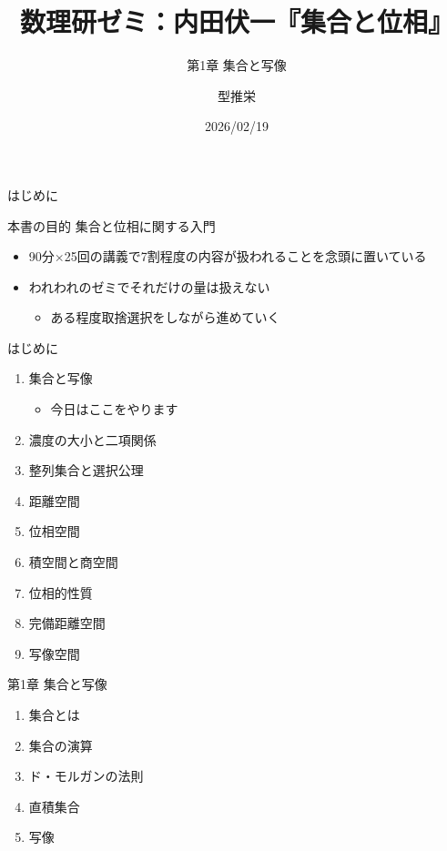 \documentclass[uplatex,a4paper,dvipdfmx,aspectratio=169,11pt]{beamer}
\title[内田集合位相ゼミ2]{数理研ゼミ：内田伏一『集合と位相』}
\subtitle{第1章 集合と写像}
\author{型推栄}
\institute[M1]{大学院情報理工学研究科 I専攻 岡本吉央研究室 M1}
\date{2026/02/19}
\begin{document}
\begin{frame}
    \titlepage
\end{frame}


\begin{frame}[fragile]{はじめに}
    \begin{block}{本書の目的}
        \Large \alert{集合}と\alert{位相}に関する入門
    \end{block}

    \bigskip

    \begin{itemize}
        \item 90分$\times$25回の講義で7割程度の内容が扱われることを念頭に置いている
        \item われわれのゼミでそれだけの量は扱えない
            \begin{itemize}
                \item ある程度取捨選択をしながら進めていく
            \end{itemize}
    \end{itemize}
\end{frame}

\begin{frame}[fragile]{はじめに}
    \medskip
    \begin{enumerate}
        \item 集合と写像
            \begin{itemize}
                \item 今日はここをやります
            \end{itemize}
        \item 濃度の大小と二項関係
        \item 整列集合と選択公理
        \item 距離空間
        \item 位相空間
        \item 積空間と商空間
        \item 位相的性質
        \item 完備距離空間
        \item 写像空間
    \end{enumerate}
\end{frame}

\begin{frame}[fragile]{第1章 集合と写像}
    \begin{enumerate}[\S 1]
        \item 集合とは
        \item 集合の演算
        \item ド・モルガンの法則
        \item 直積集合
        \item 写像
    \end{enumerate}
\end{frame}
\end{document}
